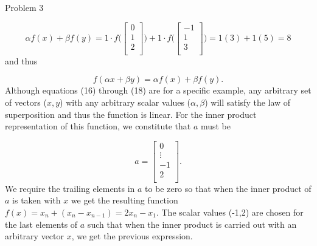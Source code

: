 \begin{problem}{Problem 3}
\begin{Highlight}
        \begin{equation}
            \alpha f(x) + \beta f(y) = 1 \cdot f \Bigg(
                \begin{bmatrix}
                    0 \\
                    1 \\
                    2 \\
                \end{bmatrix}
                \Bigg) + 1 \cdot f \Bigg(
                \begin{bmatrix}
                    -1 \\
                    1 \\
                    3 \\
                \end{bmatrix}
                \Bigg) = 1(3) + 1(5) = 8
        \end{equation}
        and thus

        \begin{equation}
            f(\alpha x + \beta y) = \alpha f(x) + \beta f(y).
        \end{equation}
        Although equations (16) through (18) are for a specific example, any arbitrary set of vectors ($x,y$) with any arbitrary scalar values ($\alpha,\beta$) will satisfy the law of superposition
        and thus the function is linear. For the inner product representation of this function, we constitute that $a$ must be

        \begin{equation}
            a = 
            \begin{bmatrix}
                0 \\
                \vdots \\
                -1 \\
                2 \\
            \end{bmatrix}.
        \end{equation}
        We require the trailing elements in $a$ to be zero so that when the inner product of $a$ is taken with $x$ we get the resulting function $f(x) = x_{n} + (x_{n} - x_{n-1}) = 2x_{n} - x_{1}$.
        The scalar values (-1,2) are chosen for the last elements of $a$ such that when the inner product is carried out with an arbitrary vector $x$, we get the previous expression.
    \end{Highlight}
\end{problem}

